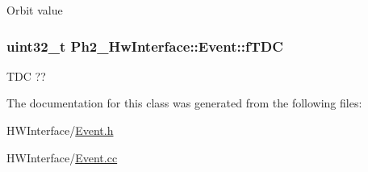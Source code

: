 Orbit value \hypertarget{class_ph2___hw_interface_1_1_event_ab91638311238d12f1cd258556c8d1d80}{
\subsubsection[{f\-T\-D\-C}]{\setlength{\rightskip}{0pt plus 5cm}uint32\-\_\-t Ph2\-\_\-\-Hw\-Interface\-::\-Event\-::f\-T\-D\-C\hspace{0.3cm}{\ttfamily [private]}}}\label{class_ph2___hw_interface_1_1_event_ab91638311238d12f1cd258556c8d1d80}
T\-D\-C ?? 

The documentation for this class was generated from the following files\-:\begin{DoxyCompactItemize}
\item 
H\-W\-Interface/\hyperlink{_event_8h}{Event.\-h}\item 
H\-W\-Interface/\hyperlink{_event_8cc}{Event.\-cc}\end{DoxyCompactItemize}
